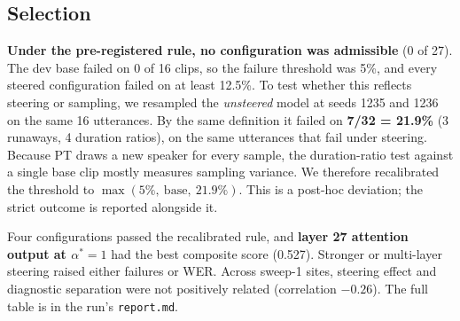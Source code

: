 \documentclass[11pt]{article}
\newcommand{\astar}{\alpha^{*}}
\begin{document}
\subsection{Selection}
\textbf{Under the pre-registered rule, no configuration was admissible} (0 of 27). The dev base failed on 0 of 16 clips, so the failure threshold was 5\%, and every steered configuration failed on at least 12.5\%. To test whether this reflects steering or sampling, we resampled the \emph{unsteered} model at seeds 1235 and 1236 on the same 16 utterances. By the same definition it failed on \textbf{7/32 = 21.9\%} (3 runaways, 4 duration ratios), on the same utterances that fail under steering. Because PT draws a new speaker for every sample, the duration-ratio test against a single base clip mostly measures sampling variance. We therefore recalibrated the threshold to $\max(5\%,\ \text{base},\ 21.9\%)$. This is a post-hoc deviation; the strict outcome is reported alongside it.

\begin{center}
\end{center}
Four configurations passed the recalibrated rule, and \textbf{layer 27 attention output at $\astar=1$} had the best composite score (0.527). Stronger or multi-layer steering raised either failures or WER. Across sweep-1 sites, steering effect and diagnostic separation were not positively related (correlation $-0.26$). The full table is in the run's \texttt{report.md}.
\end{document}
